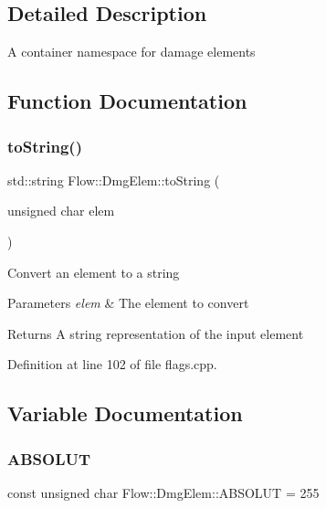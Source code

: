 \subsection{Detailed Description}
A container namespace for damage elements 

\subsection{Function Documentation}
\hypertarget{namespace_flow_1_1_dmg_elem_ad710b6c12e5119059a6975e77bdc5f80}{}\label{namespace_flow_1_1_dmg_elem_ad710b6c12e5119059a6975e77bdc5f80} 
\subsubsection{\texorpdfstring{to\+String()}{toString()}}
{\footnotesize\ttfamily std\+::string Flow\+::\+Dmg\+Elem\+::to\+String (\begin{DoxyParamCaption}\item[{unsigned char}]{elem }\end{DoxyParamCaption})}

Convert an element to a string 
\begin{DoxyParams}{Parameters}
{\em elem} & The element to convert \\
\hline
\end{DoxyParams}
\begin{DoxyReturn}{Returns}
A string representation of the input element 
\end{DoxyReturn}


Definition at line 102 of file flags.\+cpp.



\subsection{Variable Documentation}
\hypertarget{namespace_flow_1_1_dmg_elem_a91b40559f8ea36309d1459ae990e7737}{}\label{namespace_flow_1_1_dmg_elem_a91b40559f8ea36309d1459ae990e7737} 
\subsubsection{\texorpdfstring{A\+B\+S\+O\+L\+UT}{ABSOLUT}}
{\footnotesize\ttfamily const unsigned char Flow\+::\+Dmg\+Elem\+::\+A\+B\+S\+O\+L\+UT = 255}

